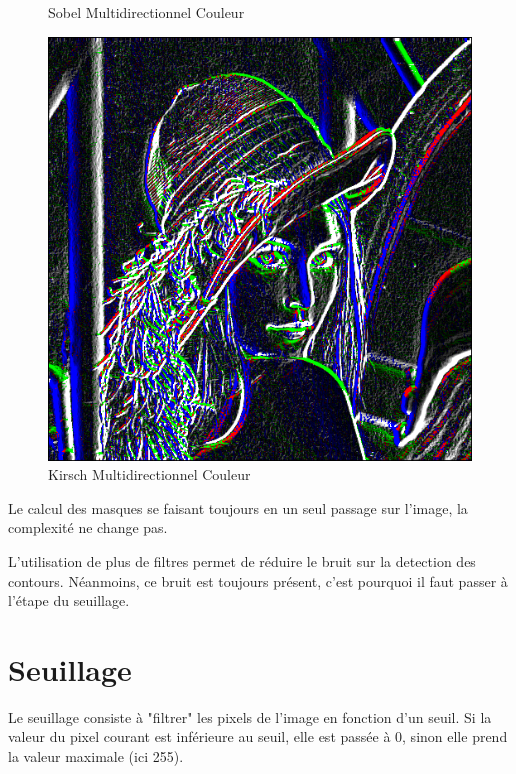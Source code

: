 \documentclass[11pt]{article}
\begin{document}
\begin{figure}[H]
\begin{minipage}[c]{.3\linewidth}
			\caption{Sobel Multidirectionnel Couleur}
			\label{fig:SobelMultidirectionnelCouleur}
		\end{minipage}\hfill
		\begin{minipage}[c]{.3\linewidth}
		\centering
		\includegraphics[scale=0.25]{Image/filtreMultidirectionnelKirschCouleur.png}
		\caption{Kirsch Multidirectionnel Couleur}
		\label{fig:KirschMultidirectionnelCouleur}
		\end{minipage}
	\end{figure}

	Le calcul des masques se faisant toujours en un seul passage sur l'image, la complexité ne change pas.

	L'utilisation de plus de filtres permet de réduire le bruit sur la detection des contours. 
	Néanmoins, ce bruit est toujours présent, c'est pourquoi il faut passer à l'étape du seuillage.
 
\section{Seuillage}
	
	Le seuillage consiste à "filtrer" les pixels de l'image en fonction d'un seuil. 
	Si la valeur du pixel courant est inférieure au seuil, elle est passée à 0, sinon elle prend la valeur maximale (ici 255).
\end{document}
